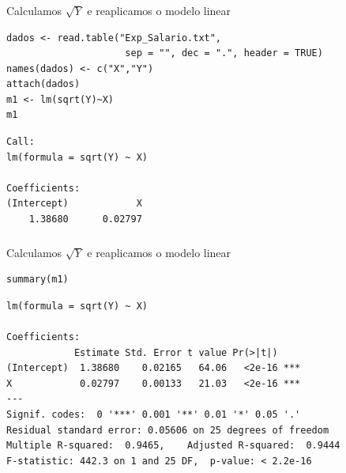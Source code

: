 \documentclass[14pt,aspectratio=1610]{beamer}
\begin{document}
\begin{frame}[fragile]{}
\frametitle{ }
\begin{block}{Calculamos $\sqrt{Y}$ e reaplicamos o modelo linear}
\begin{verbatim}
dados <- read.table("Exp_Salario.txt",
                     sep = "", dec = ".", header = TRUE)
names(dados) <- c("X","Y")
attach(dados)
m1 <- lm(sqrt(Y)~X)
m1    
\end{verbatim}
\begin{verbatim}
Call:
lm(formula = sqrt(Y) ~ X)

Coefficients:
(Intercept)            X  
    1.38680      0.02797     
\end{verbatim} 
\end{block}
\end{frame}

\begin{frame}[fragile]{}
\frametitle{ }
\begin{block}{Calculamos $\sqrt{Y}$ e reaplicamos o modelo linear}

\begin{verbatim}
summary(m1)    
\end{verbatim}
\begin{verbatim}
lm(formula = sqrt(Y) ~ X)

Coefficients:
            Estimate Std. Error t value Pr(>|t|)    
(Intercept)  1.38680    0.02165   64.06   <2e-16 ***
X            0.02797    0.00133   21.03   <2e-16 ***
---
Signif. codes:  0 '***' 0.001 '**' 0.01 '*' 0.05 '.' 
Residual standard error: 0.05606 on 25 degrees of freedom
Multiple R-squared:  0.9465,	Adjusted R-squared:  0.9444 
F-statistic: 442.3 on 1 and 25 DF,  p-value: < 2.2e-16 
\end{verbatim}

\end{block}
\end{frame}
\end{document}
